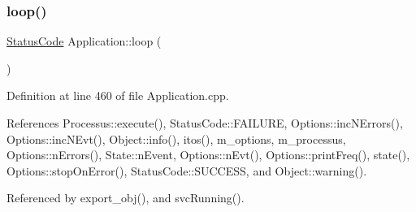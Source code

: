 \subsubsection{\texorpdfstring{loop()}{loop()}}
{\footnotesize\ttfamily \hyperlink{classStatusCode}{Status\+Code} Application\+::loop (\begin{DoxyParamCaption}{ }\end{DoxyParamCaption})}



Definition at line 460 of file Application.\+cpp.



References Processus\+::execute(), Status\+Code\+::\+F\+A\+I\+L\+U\+RE, Options\+::inc\+N\+Errors(), Options\+::inc\+N\+Evt(), Object\+::info(), itos(), m\+\_\+options, m\+\_\+processus, Options\+::n\+Errors(), State\+::n\+Event, Options\+::n\+Evt(), Options\+::print\+Freq(), state(), Options\+::stop\+On\+Error(), Status\+Code\+::\+S\+U\+C\+C\+E\+SS, and Object\+::warning().



Referenced by export\+\_\+obj(), and svc\+Running().


